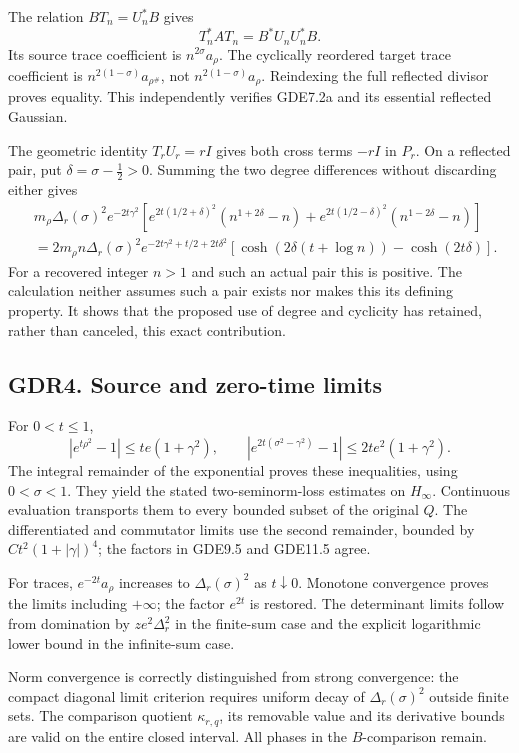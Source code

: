 The relation \(BT_n=U_n^*B\) gives \[
T_n^*AT_n=B^*U_nU_n^*B.
\tag{GDR3.1}
\] Its source trace coefficient is \(n^{2\sigma}a_\rho\). The cyclically
reordered target trace coefficient is \(n^{2(1-\sigma)}a_{\rho^\#}\),
not \(n^{2(1-\sigma)}a_\rho\). Reindexing the full reflected divisor
proves equality. This independently verifies GDE7.2a and its essential
reflected Gaussian.

The geometric identity \(T_rU_r=rI\) gives both cross terms \(-rI\) in
\(P_r\). On a reflected pair, put \(\delta=\sigma-\tfrac12>0\). Summing
the two degree differences without discarding either gives \[
\begin{aligned}
&m_\rho\Delta_r(\sigma)^2e^{-2t\gamma^2}
\left[e^{2t(1/2+\delta)^2}(n^{1+2\delta}-n)
+e^{2t(1/2-\delta)^2}(n^{1-2\delta}-n)\right]\\
&=2m_\rho n\Delta_r(\sigma)^2e^{-2t\gamma^2+t/2+2t\delta^2}
\left[\cosh(2\delta(t+\log n))-\cosh(2t\delta)\right].
\end{aligned}
\tag{GDR3.2}
\] For a recovered integer \(n>1\) and such an actual pair this is
positive. The calculation neither assumes such a pair exists nor makes
this its defining property. It shows that the proposed use of degree and
cyclicity has retained, rather than canceled, this exact contribution.

\subsection{GDR4. Source and zero-time
limits}\label{gdr4.-source-and-zero-time-limits}

For \(0<t\le1\), \[
|e^{t\rho^2}-1|\le te(1+\gamma^2),\qquad
|e^{2t(\sigma^2-\gamma^2)}-1|\le2te^2(1+\gamma^2).
\tag{GDR4.1}
\] The integral remainder of the exponential proves these inequalities,
using \(0<\sigma<1\). They yield the stated two-seminorm-loss estimates
on \(H_\infty\). Continuous evaluation transports them to every bounded
subset of the original \(Q\). The differentiated and commutator limits
use the second remainder, bounded by \(Ct^2(1+|\gamma|)^4\); the factors
in GDE9.5 and GDE11.5 agree.

For traces, \(e^{-2t}a_\rho\) increases to \(\Delta_r(\sigma)^2\) as
\(t\downarrow0\). Monotone convergence proves the limits including
\(+\infty\); the factor \(e^{2t}\) is restored. The determinant limits
follow from domination by \(ze^2\Delta_r^2\) in the finite-sum case and
the explicit logarithmic lower bound in the infinite-sum case.

Norm convergence is correctly distinguished from strong convergence: the
compact diagonal limit criterion requires uniform decay of
\(\Delta_r(\sigma)^2\) outside finite sets. The comparison quotient
\(\kappa_{r,q}\), its removable value and its derivative bounds are
valid on the entire closed interval. All phases in the \(B\)-comparison
remain.


